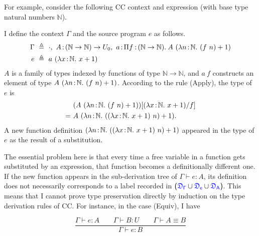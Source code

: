 For example, consider the following CC context and expression (with base type natural numbers $\mathbb{N}$).
\begin{exmp} I define the context $\Gamma$ and the source program $e$ as follows.
\begin{align*}
	\Gamma\ & \triangleq\ \cdot,\ A \goodcolon (\mathbb{N} \rightarrow \mathbb{N}) \rightarrow U_0,\ 
	a \goodcolon \pitype{f}{(\mathbb{N} \rightarrow \mathbb{N})}{A\ (\lam{n}{\mathbb{N}}{(f\ n) + 1})} \\
	e\ & \triangleq\ a\ (\lam{x}{\mathbb{N}}{x+1})
\end{align*}
$A$ is a family of types indexed by functions of type $\mathbb{N} \rightarrow \mathbb{N}$, and $a\ f$ constructs an element of type $A\ (\lam{n}{\mathbb{N}}{(f\ n) + 1})$. According to the rule (Apply), the type of $e$ is 
\begin{align*}
	& (A\ (\lambda n\hspace{0.5mm}{:}\hspace{0.5mm}\mathbb{N}.\ (f\ n) + 1))[(\lambda x\hspace{0.5mm}{:}\hspace{0.5mm}\mathbb{N}.\ x+1)\slash f]\\
	=\ & A\ (\lambda n\hspace{0.5mm}{:}\hspace{0.5mm}\mathbb{N}.\ ((\lambda x\hspace{0.5mm}{:}\hspace{0.5mm}\mathbb{N}.\ x+1)\ n) + 1).
\end{align*}
A new function definition $(\lam{n}{\mathbb{N}}{((\lam{x}{\mathbb{N}}{x+1})\ n) + 1})$ appeared in the type of $e$ as the result of a substitution.
\label{exp: new type}
\end{exmp}

The essential problem here is that every time a free variable in a function gets substituted by an expression, that function becomes a definitionally different one. If the new function appears in the sub-derivation tree of $\Gamma \vdash e : A$, its definition does not necessarily corresponds to a label recorded in $\sfpl \target{\fdef_{\Gamma}} \cup \target{\fdef_{e}} \cup \target{\fdef_{A}} \sfpr$. This means that I cannot prove type preservation directly by induction on the type derivation rules of CC. For instance, in the case (Equiv), I have

\begin{equation*}
	\frac
	{\Gamma \vdash e : A \qquad \Gamma \vdash B : U \qquad \Gamma \vdash A \equiv B}
	{\Gamma \vdash e : B}
\end{equation*}

